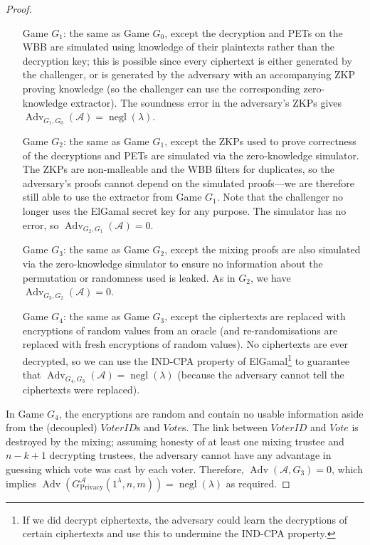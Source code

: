\documentclass[12pt,a4paper]{article}
\DeclareMathOperator{\negl}{\text{negl}}
\DeclareMathOperator{\Adv}{\text{Adv}}
\theoremstyle{definition}
\newcommand{\Vote}{\mathit{Vote}}
\newcommand{\VoterID}{\mathit{VoterID}}
\begin{document}
\begin{proof}
\begin{itemize}[leftmargin=4em]
        \item[Game] $G_1$: the same as Game $G_0$, except the decryption and PETs on the WBB are simulated using knowledge of their plaintexts rather than the decryption key; this is possible since every ciphertext is either generated by the challenger, or is generated by the adversary with an accompanying ZKP proving knowledge (so the challenger can use the corresponding zero-knowledge extractor). The soundness error in the adversary's ZKPs gives $\Adv_{G_1, G_0}(\mathcal{A})=\negl(\lambda)$.
 
        \item[Game] $G_2$: the same as Game $G_1$, except the ZKPs used to prove correctness of the decryptions and PETs are simulated via the zero-knowledge simulator. The ZKPs are non-malleable and the WBB filters for duplicates, so the adversary's proofs cannot depend on the simulated proofs---we are therefore still able to use the extractor from Game $G_1$. Note that the challenger no longer uses the ElGamal secret key for any purpose. The simulator has no error, so $\Adv_{G_2, G_1}(\mathcal{A})=0$.
 
        \item[Game] $G_3$: the same as Game $G_2$, except the mixing proofs are also simulated via the zero-knowledge simulator to ensure no information about the permutation or randomness used is leaked. As in $G_2$, we have $\Adv_{G_3, G_2}(\mathcal{A})=0$.
        
        \item[Game] $G_4$: the same as Game $G_3$, except the ciphertexts are replaced with encryptions of random values from an oracle (and re-randomisations are replaced with fresh encryptions of random values). No ciphertexts are ever decrypted, so we can use the IND-CPA property of ElGamal\footnote{If we did decrypt ciphertexts, the adversary could learn the decryptions of certain ciphertexts and use this to undermine the IND-CPA property.} to guarantee that $\Adv_{G_4,G_3}(\mathcal{A})=\negl(\lambda)$ (because the adversary cannot tell the ciphertexts were replaced).
    \end{itemize}
    In Game $G_4$, the encryptions are random and contain no usable information aside from the (decoupled) $\VoterID$s and $\Vote$s. The link between $\VoterID$ and $\Vote$ is destroyed by the mixing; assuming honesty of at least one mixing trustee and $n - k + 1$ decrypting trustees, the adversary cannot have any advantage in guessing which vote was cast by each voter. Therefore, $\Adv(\mathcal{A}, G_3)=0$, which implies $\Adv\left(G^\mathcal{A}_{\text{Privacy}}(1^\lambda, n, m)\right)=\negl(\lambda)$ as required.
\end{proof}
\end{document}
